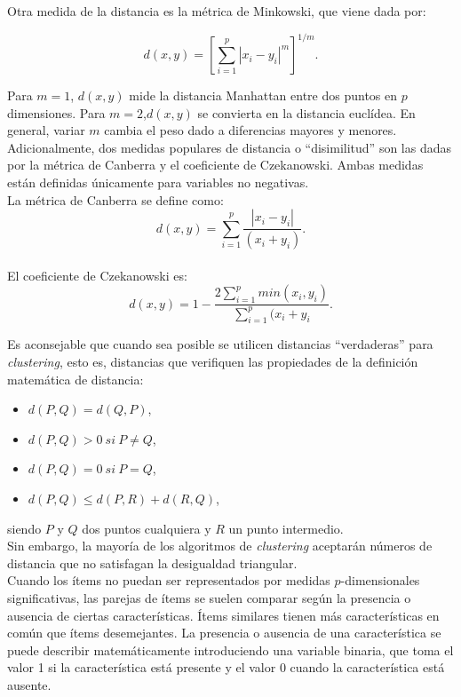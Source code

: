 \documentclass[a4paper, 20pt]{article}
\begin{document}
Otra medida de la distancia es la métrica de Minkowski, que viene dada por:

$$ d(x,y)=\left  [\sum_{i=1}^{p}{|x_i-y_i|^m} \right ]^{1/m}.$$

Para $m=1$, $d(x,y)$ mide la distancia Manhattan entre dos puntos en $p$ dimensiones. Para $m=2$,$d(x,y)$ se convierta en la distancia euclídea. En general, variar $m$ cambia el peso dado a diferencias mayores y menores.\\

Adicionalmente, dos medidas populares de distancia o ``disimilitud'' son las dadas por la métrica de Canberra y el coeficiente de Czekanowski. Ambas medidas están definidas únicamente para variables no negativas.\\

La métrica de Canberra se define como: \[d(x,y)=\sum_{i=1}^{p}{\frac{|x_i-y_i|}{(x_i+y_i)}}.\]\\

El coeficiente de Czekanowski es: \[d(x,y)=1-\frac{2\sum_{i=1}^{p}{min(x_i,y_i)}}{\sum_{i=1}^{p}{(x_i+y_i}}.\]

Es aconsejable que cuando sea posible se utilicen distancias ``verdaderas'' para \textit{clustering}, esto es, distancias que verifiquen las propiedades de la definición matemática de distancia:
\begin{itemize}
\item $d(P,Q)=d(Q,P)$,
\item $d(P,Q)>0\ si\ P\neq Q$,
\item $d(P,Q)=0\ si\ P=Q$,
\item $d(P,Q)\leq d(P,R)+d(R,Q)$,
\end{itemize}

siendo $P$ y $Q$ dos puntos cualquiera y $R$ un punto intermedio.\\ 

Sin embargo, la mayoría de los algoritmos de \textit{clustering} aceptarán números de distancia que no satisfagan la desigualdad triangular.\\

Cuando los ítems no puedan ser representados por medidas $p$-dimensionales significativas, las parejas de ítems se suelen comparar según la presencia o ausencia de ciertas características. Ítems similares tienen más características en común que ítems desemejantes. La presencia o ausencia de una característica se puede describir matemáticamente introduciendo una variable binaria, que toma el valor 1 si la característica está presente y el valor 0 cuando la característica está ausente. 
\end{document}
